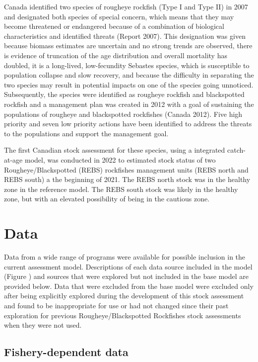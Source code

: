 \documentclass[
]{scrartcl}
\begin{document}
Canada identified two species of rougheye rockfish (Type I and Type II)
in 2007 and designated both species of special concern, which means that
they may become threatened or endangered because of a combination of
biological characteristics and identified threats (Report 2007). This
designation was given because biomass estimates are uncertain and no
strong trends are observed, there is evidence of truncation of the age
distribution and overall mortality has doubled, it is a long-lived,
low-fecundity Sebastes species, which is susceptible to population
collapse and slow recovery, and because the difficulty in separating the
two species may result in potential impacts on one of the species going
unnoticed. Subsequently, the species were identified as rougheye
rockfish and blackspotted rockfish and a management plan was created in
2012 with a goal of sustaining the populations of rougheye and
blackspotted rockfishes (Canada 2012). Five high priority and seven low
priority actions have been identified to address the threats to the
populations and support the management goal.

The first Canadian stock assessment for these species, using a
integrated catch-at-age model, was conducted in 2022 to estimated stock
status of two Rougheye/Blackspotted (REBS) rockfishes management units
(REBS north and REBS south) a the beginning of 2021. The REBS north
stock was in the healthy zone in the reference model. The REBS south
stock was likely in the healthy zone, but with an elevated possibility
of being in the cautious zone.

\newpage{}

\section{Data}\label{data}

Data from a wide range of programs were available for possible inclusion
in the current assessment model. Descriptions of each data source
included in the model (Figure ) and sources that were explored but not
included in the base model are provided below. Data that were excluded
from the base model were excluded only after being explicitly explored
during the development of this stock assessment and found to be
inappropriate for use or had not changed since their past exploration
for previous Rougheye/Blackspotted Rockfishes stock assessments when
they were not used.

\subsection{Fishery-dependent data}\label{fishery-dependent-data}
\end{document}
